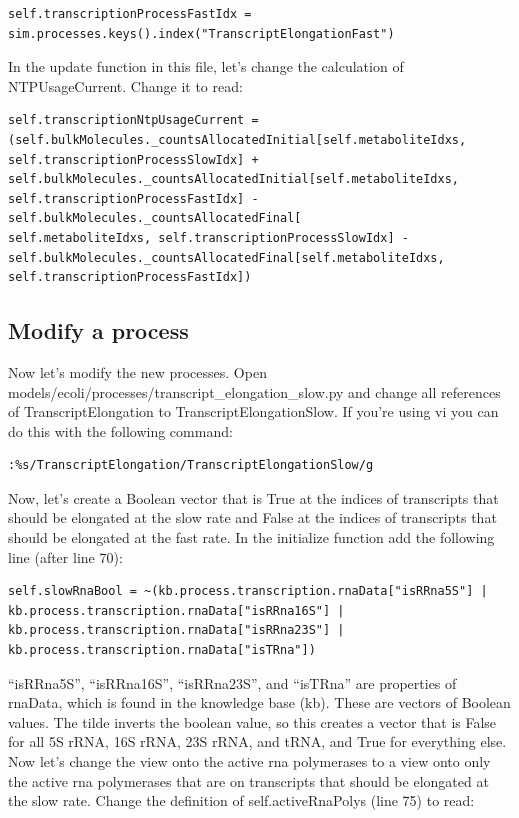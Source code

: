 \documentclass[12pt]{article}
\begin{document}
\begin{lstlisting}
self.transcriptionProcessFastIdx = sim.processes.keys().index("TranscriptElongationFast")
\end{lstlisting}

In the update function in this file, let’s change the calculation of NTPUsageCurrent. Change it to read: 

\begin{lstlisting}
self.transcriptionNtpUsageCurrent = (self.bulkMolecules._countsAllocatedInitial[self.metaboliteIdxs, self.transcriptionProcessSlowIdx] + self.bulkMolecules._countsAllocatedInitial[self.metaboliteIdxs, self.transcriptionProcessFastIdx] - self.bulkMolecules._countsAllocatedFinal[
self.metaboliteIdxs, self.transcriptionProcessSlowIdx] - self.bulkMolecules._countsAllocatedFinal[self.metaboliteIdxs, self.transcriptionProcessFastIdx])
\end{lstlisting}

\subsection{Modify a process}

Now let’s modify the new processes. Open models/ecoli/processes/transcript\_elongation\_slow.py and change all references of TranscriptElongation to TranscriptElongationSlow. If you’re using vi you can do this with the following command:

\lstset{language=bash}
\begin{lstlisting}
:%s/TranscriptElongation/TranscriptElongationSlow/g
\end{lstlisting}

Now, let’s create a Boolean vector that is True at the indices of transcripts that should be elongated at the slow rate and False at the indices of transcripts that should be elongated at the fast rate. In the initialize function add the following line (after line 70):

\lstset{language=Python}
\begin{lstlisting}
self.slowRnaBool = ~(kb.process.transcription.rnaData["isRRna5S"] | kb.process.transcription.rnaData["isRRna16S"] | kb.process.transcription.rnaData["isRRna23S"] | kb.process.transcription.rnaData["isTRna"])
\end{lstlisting}

“isRRna5S”, “isRRna16S”, “isRRna23S”, and “isTRna” are properties of rnaData, which is found in the knowledge base (kb). These are vectors of Boolean values. The tilde inverts the boolean value, so this creates a vector that is False for all 5S rRNA, 16S rRNA, 23S rRNA, and tRNA, and True for everything else.
Now let’s change the view onto the active rna polymerases to a view onto only the active rna polymerases that are on transcripts that should be elongated at the slow rate. Change the definition of self.activeRnaPolys (line 75) to read:
\end{document}
